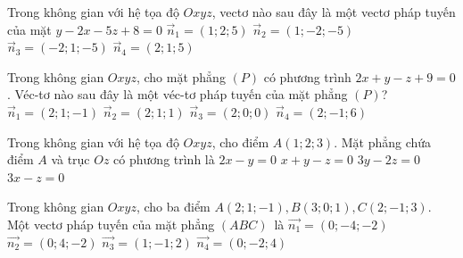 \begin{ex}%
	Trong không gian với hệ tọa độ $Oxyz$, vectơ nào sau đây là một vectơ pháp tuyến của mặt  $y-2x-5z+8=0$
	\choice 
		{$\overrightarrow{n}_1=(1;2;5)$} 
		 {$\overrightarrow{n}_2=(1;-2;-5)$}
		 {\True $\overrightarrow{n}_3=(-2;1;-5)$}
		 {$\overrightarrow{n}_4=(2;1;5)$}
\end{ex}

\begin{ex}%
	Trong không gian $Oxyz$, cho mặt phẳng $(P)$ có phương trình $2x+y-z+9=0$. Véc-tơ nào sau đây là  một véc-tơ pháp tuyến của mặt phẳng $(P)$?
	 \choice
		{\True $\overrightarrow{n}_{1}=(2;1;-1)$} 
		{$\overrightarrow{n}_{2}=(2;1;1)$} 
		{$\overrightarrow{n}_{3}=(2;0;0)$} 
		 {$\overrightarrow{n}_{4}=(2;-1;6)$}
\end{ex}

\begin{ex}%
	Trong không gian với hệ tọa độ $Oxyz$, cho điểm $A(1;2;3)$. Mặt phẳng chứa điểm $A$ và  trục $Oz$ có phương trình là
	\choice 
		 {\True $2x - y = 0$}
		{$x + y - z =  0$}
		{$3y - 2z = 0$} 
		{$3x - z = 0$} 
\end{ex}

\begin{ex}%
	Trong không  gian $Oxyz$, cho ba điểm $A(2;1;-1), B(3;0;1), C(2;-1;3)$. Một vectơ pháp tuyến của mặt phẳng $(ABC)$~là
	 \choice
		 {\True $\overrightarrow{n_1}=(0;-4;-2)$}
		 {$\overrightarrow{n_2}=(0;4;-2)$}
		{$\overrightarrow{n_3}=(1;-1;2)$} 
		{$\overrightarrow{n_4}=(0;-2;4)$} 
\end{ex}

